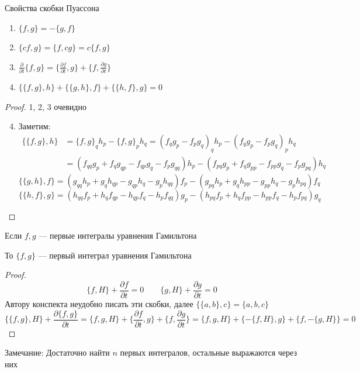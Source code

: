 \documentclass[crop=false]{standalone}
\begin{document}
\noindent \keypoint Свойства скобки Пуассона
\begin{enumerate}
    \item $\{f, g\} = - \{g, f\}$
    \item $\{c f, g\} = \{ f, c g \} = c \{f , g\}$
    \item $\frac{\partial}{\partial t} \{f, g\} = \{\frac{\partial f}{\partial t}, g\} + \{f, \frac{\partial g}{\partial t}\}$
    \item $\{\{f, g\}, h\} + \{\{g, h\}, f\} + \{\{h, f\}, g\} = 0$
\end{enumerate}
\begin{proof}
    1, 2, 3 очевидно
    \begin{enumerate}
        \setcounter{enumi}{3} 
        \item Заметим:
        \[
        \begin{aligned}
            \{\{f, g\}, h\} &= \{f, g\}_q h_p - \{f, g\}_p h_q = \left(f_q g_p - f_p g_q \right)_q h_p - \left(f_q g_p - f_p g_q \right)_p h_q \\
            &= \left(f_{qq} g_p + f_q g_{qp} - f_{qp} g_{q} - f_p g_{qq}\right) h_p - \left(f_{pq} g_p + f_q g_{pp} - f_{pp} g_q - f_p g_{pq} \right) h_q
        \end{aligned}\]
        \[
            \{\{g, h\}, f\} = \left(g_{qq} h_p + g_q h_{qp} - g_{qp} h_{q} - g_p h_{qq}\right) f_p - \left(g_{pq} h_p + g_q h_{pp} - g_{pp} h_q - g_p h_{pq} \right) f_q
        \]
        \[
            \{\{h, f\}, g\} = \left(h_{qq} f_p + h_q f_{qp} - h_{qp} f_{q} - h_p f_{qq}\right) g_p - \left(h_{pq} f_p + h_q f_{pp} - h_{pp} f_q - h_p f_{pq} \right) g_q
        \]
    \end{enumerate}
\end{proof}

\begin{theorem}
    Если $f,g$ — первые интегралы уравнения Гамильтона
    
    То  $\{f, g\}$ — первый интеграл уравнения Гамильтона
\end{theorem}
\begin{proof}
    \[\{f, H\} + \frac{\partial f}{\partial t} = 0 \qquad \{g, H\} + \frac{\partial g}{\partial t} = 0\]
    Автору конспекта неудобно писать эти скобки, далее $\{\{a, b\}, c\} = \{a, b , c\}$
    \[\{\{f, g\}, H\} + \frac{\partial \{f, g\}}{\partial t} = \{f, g, H\} + \{\frac{\partial f}{\partial t}, g\} + \{f, \frac{\partial g}{\partial t}\}  = \{f, g, H\} + \{-\{f , H\}, g\} + \{f, -\{g, H\}\} = 0\]
\end{proof}
Замечание:
Достаточно найти $n$ первых интегралов, остальные выражаются через них
\end{document}
